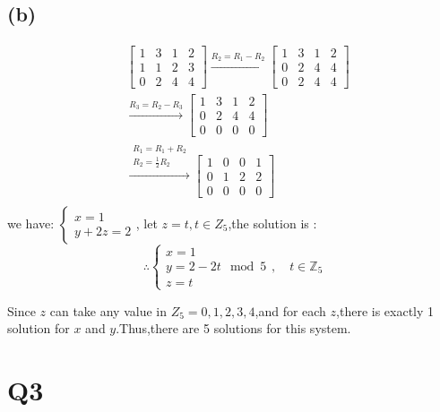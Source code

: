 \documentclass[12pt]{article}
\begin{document}
	\subsection*{(b)}
		$$
		\begin{aligned}
		& \left[\begin{array}{ccc|c}
		1 & 3 & 1 & 2 \\
		1 & 1 & 2 & 3 \\
		0 & 2 & 4 & 4
		\end{array}\right] 
		\xrightarrow{R_2 = R_1 - R_2} 
		\left[\begin{array}{ccc|c}
		1 & 3 & 1 & 2 \\
		0 & 2 & 4 & 4 \\
		0 & 2 & 4 & 4
		\end{array}\right] \\
		& \xrightarrow{R_3 = R_2 - R_3}
		\left[\begin{array}{ccc|c}
		1 & 3 & 1 & 2 \\
		0 & 2 & 4 & 4 \\
		0 & 0 & 0 & 0
		\end{array}\right] \\
		& \xrightarrow{\substack{R_1 = R_1 + R_2 \\ R_2 = \frac{1}{2}R_2}}
		\left[\begin{array}{ccc|c}
		1 & 0 & 0 & 1 \\
		0 & 1 & 2 & 2 \\
		0 & 0 & 0 & 0
		\end{array}\right] \\
		\end{aligned}
		$$
		we have: $\left\{\begin{array}{l}
		x=1 \\
		y + 2z = 2 
		\end{array}\right.$, let $z = t, t \in Z_5$,the solution is :
		$$
		\therefore \left\{\begin{array}{l}
		x=1 \\
		y=2-2t \mod 5 \\
		z=t
		\end{array}\right., \quad t \in \mathbb{Z}_5
		$$

		Since $z$ can take any value in $Z_5 = {0,1,2,3,4}$,and for each $z$,there is exactly 1 solution for $x$ and $y$.Thus,there are 5 solutions for this system.

\section{Q3}
\end{document}
